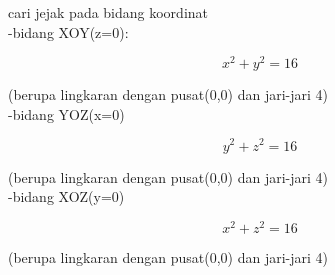 \documentclass[a4paper,10pt]{article}
\begin{document}
\begin{eulernotebook}
\begin{eulercomment}
\begin{eulercomment}
\begin{eulercomment}
cari jejak pada bidang koordinat\\
-bidang XOY(z=0):\\
\end{eulercomment}
\begin{eulerformula}
\[
x^2+y^2=16
\]
\end{eulerformula}
\begin{eulercomment}
(berupa lingkaran dengan pusat(0,0) dan jari-jari 4)\\
-bidang YOZ(x=0)\\
\end{eulercomment}
\begin{eulerformula}
\[
y^2+z^2=16
\]
\end{eulerformula}
\begin{eulercomment}
(berupa lingkaran dengan pusat(0,0) dan jari-jari 4)\\
-bidang XOZ(y=0)\\
\end{eulercomment}
\begin{eulerformula}
\[
x^2+z^2=16
\]
\end{eulerformula}
\begin{eulercomment}
(berupa lingkaran dengan pusat(0,0) dan jari-jari 4)


\end{eulercomment}
\end{eulercomment}
\end{eulercomment}
\end{eulernotebook}
\end{document}
